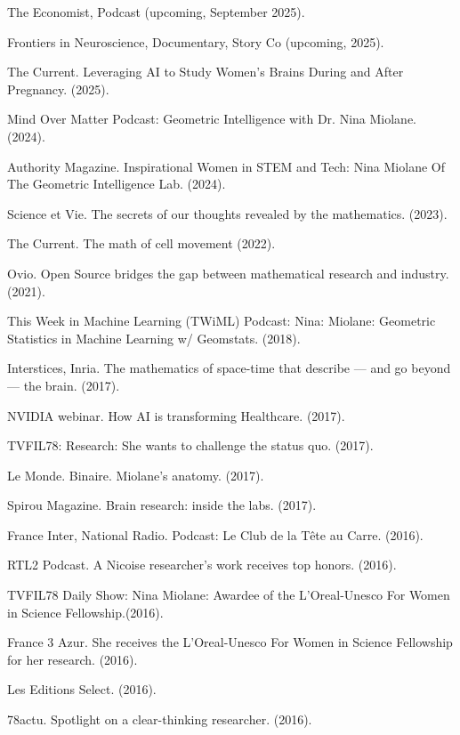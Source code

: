 The Economist, Podcast (upcoming, September 2025).

Frontiers in Neuroscience, Documentary, Story Co (upcoming, 2025).

The Current. Leveraging AI to Study Women’s Brains During and After Pregnancy. (2025).

Mind Over Matter Podcast: Geometric Intelligence with Dr. Nina Miolane. (2024).

Authority Magazine. Inspirational Women in STEM and Tech: Nina Miolane Of The Geometric Intelligence Lab. (2024).

Science et Vie. The secrets of our thoughts revealed by the mathematics. (2023).

The Current. The math of cell movement (2022).

Ovio. Open Source bridges the gap between mathematical research and industry. (2021).

This Week in Machine Learning (TWiML) Podcast: Nina: Miolane: Geometric Statistics in Machine Learning w/ Geomstats. (2018).

Interstices, Inria. The mathematics of space-time that describe — and go beyond — the brain. (2017).

NVIDIA webinar. How AI is transforming Healthcare. (2017).

TVFIL78: Research: She wants to challenge the status quo. (2017).

Le Monde. Binaire. Miolane’s anatomy. (2017).

Spirou Magazine. Brain research: inside the labs. (2017).

France Inter, National Radio. Podcast: Le Club de la Tête au Carre. (2016). 

RTL2 Podcast. A Nicoise researcher’s work receives top honors. (2016).

TVFIL78 Daily Show: Nina Miolane: Awardee of the L’Oreal-Unesco For Women in Science Fellowship.(2016).

France 3 Azur. She receives the L’Oreal-Unesco For Women in Science Fellowship for her research. (2016).

Les Editions Select. (2016).

78actu. Spotlight on a clear-thinking researcher. (2016).